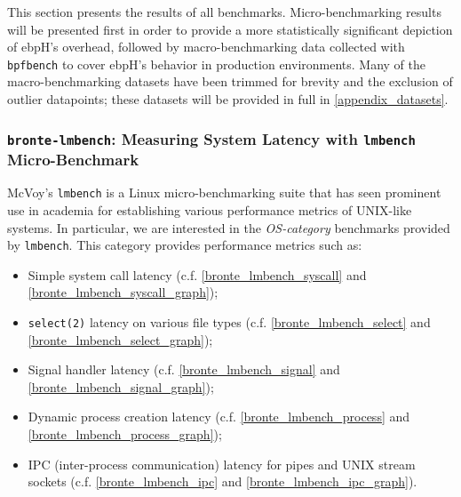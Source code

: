 \documentclass[
  12pt]{findlay}
\newcommand{\passthrough}[1]{#1}
\providecommand{\tightlist}{\setlength{\itemsep}{0pt}\setlength{\parskip}{0pt}}
\begin{document}
This section presents the results of all benchmarks. Micro-benchmarking
results will be presented first in order to provide a more statistically
significant depiction of ebpH's overhead, followed by macro-benchmarking
data collected with \passthrough{\lstinline!bpfbench!} to cover ebpH's
behavior in production environments. Many of the macro-benchmarking
datasets have been trimmed for brevity and the exclusion of outlier
datapoints; these datasets will be provided in full in
\autoref{appendix_datasets}.

\hypertarget{bronte-lmbench-measuring-system-latency-with-lmbench-micro-benchmark}{%
\subsubsection{\texorpdfstring{\texttt{bronte-lmbench}: Measuring System
Latency with \texttt{lmbench}
Micro-Benchmark}{bronte-lmbench: Measuring System Latency with lmbench Micro-Benchmark}}\label{bronte-lmbench-measuring-system-latency-with-lmbench-micro-benchmark}}

\label{lmbench_section}

McVoy's \passthrough{\lstinline!lmbench!} \autocite{lmbench,lmbenchgit}
is a Linux micro-benchmarking suite that has seen prominent use in
academia \autocite{lmbenchex1,lmbenchex2,lmbenchex3,lmbenchex4} for
establishing various performance metrics of UNIX-like systems. In
particular, we are interested in the \emph{OS-category} benchmarks
provided by \passthrough{\lstinline!lmbench!}. This category provides
performance metrics such as:

\begin{itemize}
\tightlist
\item
  Simple system call latency (c.f. \autoref{bronte_lmbench_syscall} and
  \autoref{bronte_lmbench_syscall_graph});
\item
  \passthrough{\lstinline!select(2)!} latency on various file types
  (c.f. \autoref{bronte_lmbench_select} and
  \autoref{bronte_lmbench_select_graph});
\item
  Signal handler latency (c.f. \autoref{bronte_lmbench_signal} and
  \autoref{bronte_lmbench_signal_graph});
\item
  Dynamic process creation latency (c.f.
  \autoref{bronte_lmbench_process} and
  \autoref{bronte_lmbench_process_graph});
\item
  IPC (inter-process communication) latency for pipes and UNIX stream
  sockets (c.f. \autoref{bronte_lmbench_ipc} and
  \autoref{bronte_lmbench_ipc_graph}).
\end{itemize}
\end{document}
